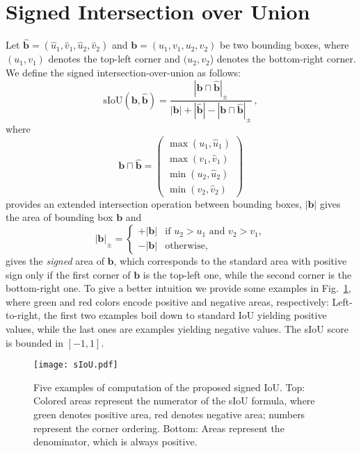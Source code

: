 \documentclass[10pt,twocolumn,letterpaper]{article}
\newcommand{\vct}[1]{\ensuremath{\boldsymbol{#1}}}
\begin{document}
\section{Signed Intersection over Union}\label{sec:siou}
Let $\vct{\hat b}=(\hat u_1,\hat v_1,\hat u_2,\hat v_2)$ and $\vct b=(u_1,v_1,u_2,v_2)$ be two bounding boxes, where $(u_1,v_1)$ denotes the top-left corner and $(u_2, v_2$) denotes the bottom-right corner.
We define the signed intersection-over-union as follows:
\begin{equation}\label{eq:sIoU}
\text{sIoU}(\vct b,\vct{\hat b})=\frac{|\vct b\sqcap\vct{\hat b}|_\pm}{|\vct b|+|\vct {\hat b}|-|\vct b\sqcap\vct{\hat b}|_\pm}\,,
\end{equation}
where
\[
\vct b\sqcap\vct{\hat b}=
\begin{pmatrix}
\max(u_1,\hat u_1)\\
\max(v_1,\hat v_1)\\
\min(u_2,\hat u_2)\\
\min(v_2,\hat v_2)
\end{pmatrix}
\]
provides an extended intersection operation between bounding boxes, $|\vct b|$ gives the area of bounding box $\vct b$ and
\[
|\vct b|_\pm=
\begin{cases}
+|\vct b|&\text{if } u_2>u_1\text{ and }v_2>v_1,\\
-|\vct b|&\text{otherwise,}
\end{cases}
\]
gives the \emph{signed} area of $\vct b$, which corresponds to the standard area with positive sign only if the first corner of $\vct b$ is the top-left one, while the second corner is the bottom-right one. To give a better intuition we provide some examples in Fig.~\ref{fig:sIoU}, where green and red colors encode positive and negative areas, respectively: Left-to-right, the first two examples boil down to standard IoU yielding positive values, while the last ones are examples yielding negative values. The sIoU score is bounded in $[-1,1]$.
\begin{figure}[ht]
    \centering
    \texttt{[image: sIoU.pdf]}
    \caption{Five examples of computation of the proposed signed IoU. Top: Colored areas represent the numerator of the sIoU formula, where green denotes positive area, red denotes negative area; numbers represent the corner ordering. Bottom: Areas represent the denominator, which is always positive. }
    \label{fig:sIoU}
\end{figure}
\end{document}

